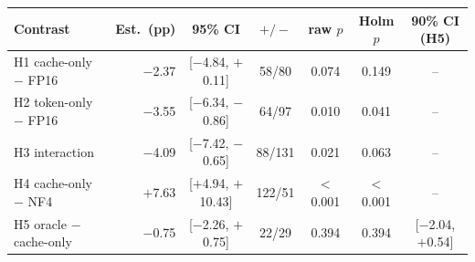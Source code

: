 \begin{tabular}{lrccccc}
\toprule
Contrast & Est.\ (pp) & 95\% CI & $+/-$ & raw $p$ & Holm $p$ & 90\% CI (H5) \\
\midrule
H1 cache-only $-$ FP16 & $-$2.37 & [$-$4.84, $+$0.11] & 58/80 & 0.074 & 0.149 & -- \\
H2 token-only $-$ FP16 & $-$3.55 & [$-$6.34, $-$0.86] & 64/97 & 0.010 & 0.041 & -- \\
H3 interaction & $-$4.09 & [$-$7.42, $-$0.65] & 88/131 & 0.021 & 0.063 & -- \\
H4 cache-only $-$ NF4 & $+$7.63 & [$+$4.94, $+$10.43] & 122/51 & $<$0.001 & $<$0.001 & -- \\
H5 oracle $-$ cache-only & $-$0.75 & [$-$2.26, $+$0.75] & 22/29 & 0.394 & 0.394 & [$-$2.04, $+$0.54] \\
\bottomrule
\end{tabular}

